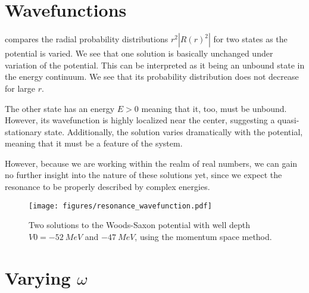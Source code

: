 \section{Wavefunctions}

 compares the radial probability distributions $r^2|R(r)^2|$ for two states as the potential is varied. We see that one solution is basically unchanged under variation of the potential. This can be interpreted as it being an unbound state in the energy continuum. We see that its probability distribution does not decrease for large $r$.

The other state has an energy $E>0$ meaning that it, too, must be unbound. However, its wavefunction is highly localized near the center, suggesting a quasi-stationary state. Additionally, the solution varies dramatically with the potential, meaning that it must be a feature of the system. 

However, because we are working within the realm of real numbers, we can gain no further insight into the nature of these solutions yet, since we expect the resonance to be properly described by complex energies. 


\begin{figure}[H]
  \centering
  \texttt{[image: figures/resonance\_wavefunction.pdf]}
  \caption{Two solutions to the Woods-Saxon potential with well depth $V0=\SI{-52}{MeV}$ and $\SI{-47}{MeV}$, using the momentum space method.}
  \label{fig:resonance wavefunction}
\end{figure}

\section{Varying $\omega$}
